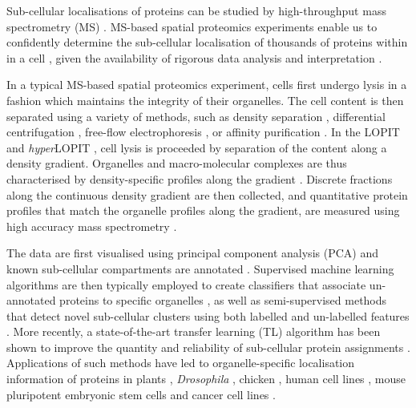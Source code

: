 \documentclass[12pt,english]{article}\usepackage[]{graphicx}\usepackage[]{color}
\begin{document}
Sub-cellular localisations of proteins
can be studied by high-throughput mass spectrometry (MS)
\citep{Gatto:2010}. MS-based spatial proteomics experiments enable us
to confidently determine the sub-cellular localisation of thousands of
proteins within in a cell \citep{hyper}, given the availability of
rigorous data analysis and interpretation \citep{Gatto:2010}.

In a typical MS-based spatial proteomics experiment, cells first
undergo lysis in a fashion which maintains the integrity of their
organelles. The cell content is then separated using a variety of
methods, such as density separation \citep{Dunkley:2006,hyper},
differential centrifugation \citep{Itzhak:2016}, free-flow
electrophoresis \citep{Parsons:2014}, or affinity purification
\citep{Heard:2015}. In the LOPIT \citep{Dunkley:2004, Dunkley:2006,
  Sadowski:2006} and \textit{hyper}LOPIT \citep{Mulvey:2017}, cell
lysis is proceeded by separation of the content along a density
gradient. Organelles and macro-molecular complexes are thus
characterised by density-specific profiles along the gradient
\citep{DeDuve:1981}.  Discrete fractions along the continuous density
gradient are then collected, and quantitative protein profiles that
match the organelle profiles along the gradient, are measured using
high accuracy mass spectrometry \citep{Mulvey:2017}.

The data are first visualised using principal component analysis (PCA)
and known sub-cellular compartments are annotated
\citep{ghrepo}. Supervised machine learning algorithms are then
typically employed to create classifiers that associate un-annotated
proteins to specific organelles \citep{Gatto:2014b}, as well as
semi-supervised methods that detect novel sub-cellular clusters using
both labelled and un-labelled features \citep{Breckels:2013}. More
recently, a state-of-the-art transfer learning (TL) algorithm has been
shown to improve the quantity and reliability of sub-cellular protein
assignments \citep{Breckels:2016}. Applications of such methods have
led to organelle-specific localisation information of proteins in
plants \citep{Dunkley:2006}, \textit{Drosophila} \citep{Tan:2009},
chicken \citep{hall:2009}, human cell lines \citep{Breckels:2013},
mouse pluripotent embryonic stem cells \citep{hyper} and cancer cell
lines \citep{Thul:2017}.
\end{document}
